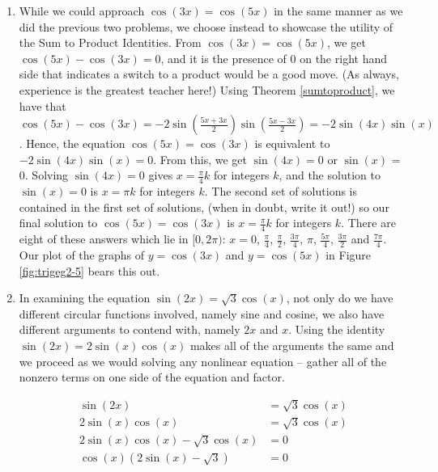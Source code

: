 {\begin{enumerate}
\item  While we could approach  $\cos(3x) = \cos(5x)$ in the same manner as we did the previous two problems, we choose instead to showcase the utility of the Sum to Product Identities.  From $\cos(3x) = \cos(5x)$, we get $\cos(5x) - \cos(3x) = 0$, and it is the presence of $0$ on the right hand side that indicates a switch to a product would be a good move. (As always, experience is the greatest teacher here!)  Using Theorem \ref{sumtoproduct}, we have that $\cos(5x) - \cos(3x)  = - 2 \sin\left( \frac{5x + 3x}{2}\right)\sin\left( \frac{5x - 3x}{2}\right) = -2 \sin(4x)\sin(x)$.  Hence, the equation $\cos(5x) = \cos(3x)$ is equivalent to $-2 \sin(4x) \sin(x) = 0$.  From this, we get $\sin(4x) = 0$ or $\sin(x)$ = 0.  Solving $\sin(4x) = 0$ gives $x = \frac{\pi}{4} k$ for integers $k$, and the solution to $\sin(x) = 0$ is $x = \pi k$ for integers $k$.  The second set of solutions is contained in the first set of solutions, (when in doubt, write it out!) so our final solution to $\cos(5x) = \cos(3x)$ is $x = \frac{\pi}{4} k$ for integers $k$.  There are eight of these answers which lie in $[0,2\pi)$:  $x = 0$, $\frac{\pi}{4}$, $\frac{\pi}{2}$, $\frac{3\pi}{4}$, $\pi$, $\frac{5\pi}{4}$, $\frac{3\pi}{2}$ and $\frac{7\pi}{4}$.  Our plot of the graphs of $y = \cos(3x)$ and $y = \cos(5x)$ in Figure \ref{fig:trigeg2-5}  bears this out. 


\item  In examining the equation   $\sin(2x) =\sqrt{3} \cos(x)$, not only do we have different circular functions involved, namely sine and cosine, we also have different arguments to contend with, namely $2x$ and $x$.  Using the identity $\sin(2x) = 2 \sin(x) \cos(x)$ makes all of the arguments the same and we proceed as we would solving any nonlinear equation -- gather all of the nonzero terms on one side of the equation and factor.

\drawexampleline

\begin{align*}
\sin(2x) & =  \sqrt{3} \cos(x)  \\
2 \sin(x) \cos(x) & =  \sqrt{3} \cos(x)   \tag*{(Since $\sin(2x) = 2\sin(x) \cos(x)$.)} \\
2\sin(x) \cos(x) - \sqrt{3} \cos(x) & =  0  \\
\cos(x) (2 \sin(x) - \sqrt{3}) & =  0 
\end{align*}


\end{enumerate}}
